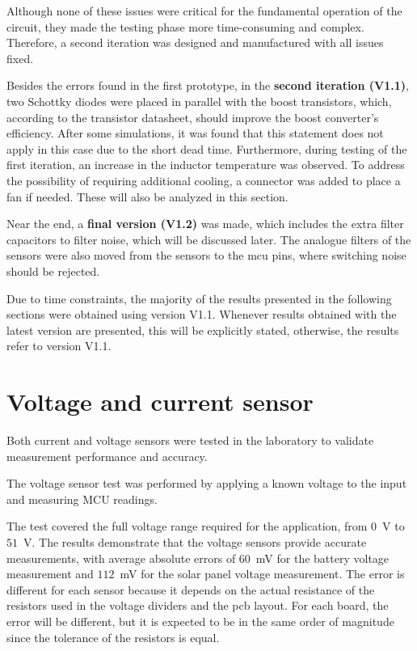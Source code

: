     Although none of these issues were critical for the fundamental operation of the circuit, they made the testing phase more time-consuming and complex. Therefore, a second iteration was designed and manufactured with all issues fixed. 

    Besides the errors found in the first prototype, in the \textbf{second iteration (V1.1)}, two Schottky diodes were placed in parallel with the boost transistors, which, according to the transistor datasheet, should improve the boost converter's efficiency. After some simulations, it was found that this statement does not apply in this case due to the short dead time. Furthermore, during testing of the first iteration, an increase in the inductor temperature was observed. To address the possibility of requiring additional cooling, a connector was added to place a fan if needed. These will also be analyzed in this section.

    Near the end, a \textbf{final version (V1.2)} was made, which includes the extra filter capacitors to filter noise, which will be discussed later. The analogue filters of the sensors were also moved from the sensors to the \ac{mcu} pins, where switching noise should be rejected.  

    Due to time constraints, the majority of the results presented in the following sections were obtained using version V1.1. Whenever results obtained with the latest version are presented, this will be explicitly stated, otherwise, the results refer to version V1.1.


\section{Voltage and current sensor}
    Both current and voltage sensors were tested in the laboratory to validate measurement performance and accuracy. 

    The voltage sensor test was performed by applying a known voltage to the input and measuring MCU readings. 

    The test covered the full voltage range required for the application, from $0$~V to $51$~V. The results demonstrate that the voltage sensors provide accurate measurements, with average absolute errors of $60$~mV for the battery voltage measurement and $112$~mV for the solar panel voltage measurement. The error is different for each sensor because it depends on the actual resistance of the resistors used in the voltage dividers and the \ac{pcb} layout. For each board, the error will be different, but it is expected to be in the same order of magnitude since the tolerance of the resistors is equal.

